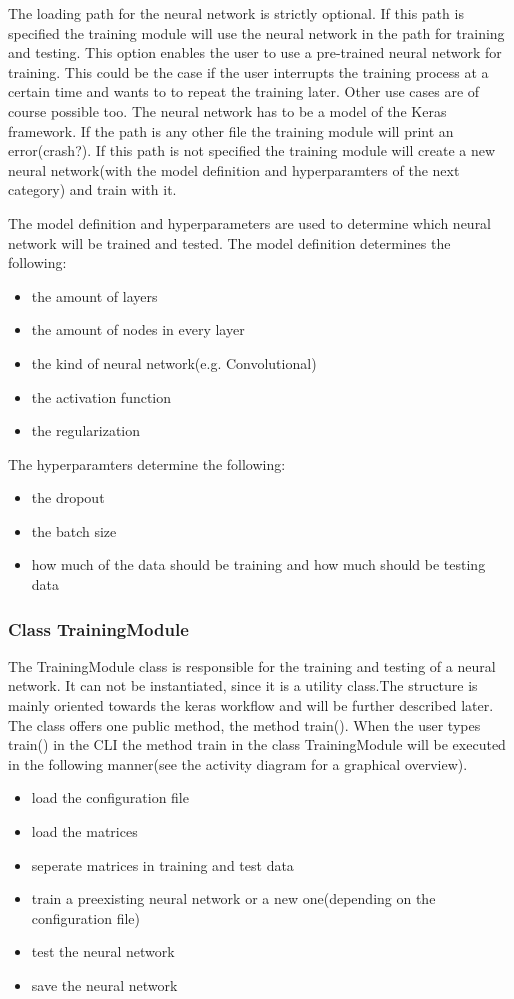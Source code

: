 \documentclass[parskip=full]{scrartcl}
\begin{document}
The loading path for the neural network is strictly optional.
If this path is specified the training module will use the neural network in the path for training and testing.
This option enables the user to use a pre-trained neural network for training.
This could be the case if the user interrupts the training process at a certain time and wants to to repeat the training later.
Other use cases are of course possible too.
The neural network has to be a model of the Keras framework. If the path is any other file the training module will print an error(crash?).
If this path is not specified the training module will create a new neural network(with the model definition and hyperparamters of the next category) and train with it. \newline

The model definition and hyperparameters are used to determine which neural network will be trained and tested. The model definition determines the following:
\begin{itemize}
\item the amount of layers
\item the amount of nodes in every layer
\item the kind of neural network(e.g. Convolutional)
\item the activation function
\item the regularization
\end{itemize}

The hyperparamters determine the following:

\begin{itemize}
\item the dropout
\item the batch size
\item how much of the data should be training and how much should be testing data
\end{itemize}

\subsubsection{Class TrainingModule}
The TrainingModule class is responsible for the training and testing of a neural network.
It can not be instantiated, since it is a utility class.The structure is mainly oriented towards the keras workflow and will be further described later.
The class offers one public method, the method train(). \newline
When the user types train() in the CLI the method train in the class TrainingModule will be executed in the following manner(see the activity diagram for a graphical overview).
\begin{itemize}
\item load the configuration file
\item load the matrices
\item seperate matrices in training and test data
\item train a preexisting neural network or a new one(depending on the configuration file)
\item test the neural network
\item save the neural network
\end{itemize}
\end{document}
